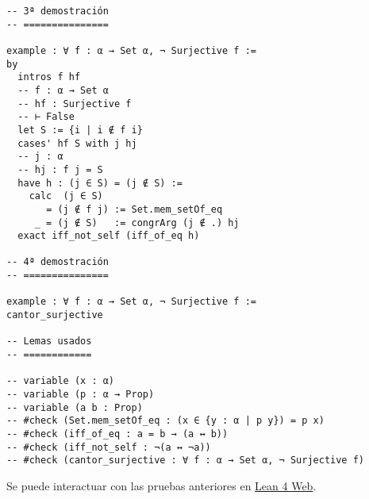 \begin{verbatim}
-- 3ª demostración
-- ===============

example : ∀ f : α → Set α, ¬ Surjective f :=
by
  intros f hf
  -- f : α → Set α
  -- hf : Surjective f
  -- ⊢ False
  let S := {i | i ∉ f i}
  cases' hf S with j hj
  -- j : α
  -- hj : f j = S
  have h : (j ∈ S) = (j ∉ S) :=
    calc  (j ∈ S)
       = (j ∉ f j) := Set.mem_setOf_eq
     _ = (j ∉ S)   := congrArg (j ∉ .) hj
  exact iff_not_self (iff_of_eq h)

-- 4ª demostración
-- ===============

example : ∀ f : α → Set α, ¬ Surjective f :=
cantor_surjective

-- Lemas usados
-- ============

-- variable (x : α)
-- variable (p : α → Prop)
-- variable (a b : Prop)
-- #check (Set.mem_setOf_eq : (x ∈ {y : α | p y}) = p x)
-- #check (iff_of_eq : a = b → (a ↔ b))
-- #check (iff_not_self : ¬(a ↔ ¬a))
-- #check (cantor_surjective : ∀ f : α → Set α, ¬ Surjective f)
\end{verbatim}
Se puede interactuar con las pruebas anteriores en \href{https://lean.math.hhu.de/\#url=https://raw.githubusercontent.com/jaalonso/Calculemus2/main/src/Teorema\_de\_Cantor.lean}{Lean 4 Web}.

